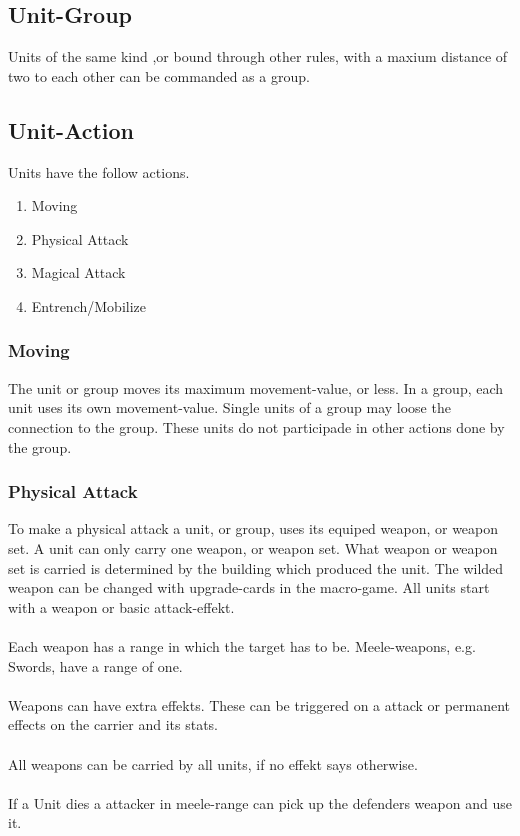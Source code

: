 \documentclass[a5paper,pagesize,10pt,bibtotoc,pointlessnumbers,
normalheadings,DIV=9,twoside=false]{scrbook}
\begin{document}
\subsection{Unit-Group}
Units of the same kind ,or bound through other rules, with a maxium distance of two to each other can be commanded as a group.

\subsection{Unit-Action}
Units have the follow actions.

\begin{enumerate}
\item Moving
\item Physical Attack
\item Magical Attack
\item Entrench/Mobilize
\end{enumerate}

\subsubsection{Moving}
The unit or group moves its maximum movement-value, or less.
In a group, each unit uses its own movement-value. Single units of a group may loose the connection to the group. These units do not participade in other actions done by the group.

\subsubsection{Physical Attack}
To make a physical attack a unit, or group, uses its equiped weapon, or weapon set. 
A unit can only carry one weapon, or weapon set.
What weapon or weapon set is carried is determined by the building which produced the unit. The wilded weapon can be changed with upgrade-cards in the macro-game.
All units start with a weapon or basic attack-effekt.\\
\\
Each weapon has a range in which the target has to be. Meele-weapons, e.g. Swords, have a range of one.\\
\\
Weapons can have extra effekts. These can be triggered on a attack or permanent effects on the carrier and its stats.\\
\\
All weapons can be carried by all units, if no effekt says otherwise.\\
\\
If a Unit dies a attacker in meele-range can pick up the defenders weapon and use it.
\end{document}
